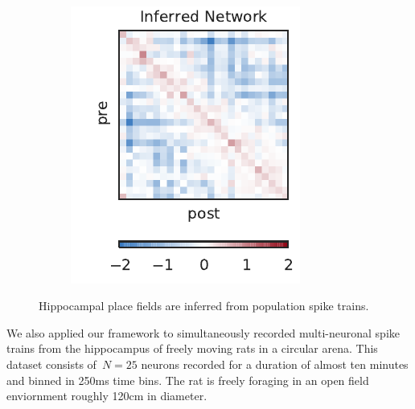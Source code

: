\begin{figure}[t!]
\begin{subfigure}[b]{2.25in}
    \label{fig:hipp_pll}
  \end{subfigure}
  ~
  \begin{subfigure}[b]{1.85in}
    \centering
    \caption{}
    \vspace{-.2in}
    \includegraphics[width=\textwidth]{figures/ch3/hipp_connectivity.pdf}
    \label{fig:hipp_conn}
  \end{subfigure}
  \vspace{-2em}
  \caption{Hippocampal place fields are inferred from population spike trains.
    }
  \label{fig:hipp}
\end{figure}

We also applied our framework to simultaneously recorded multi-neuronal spike trains from the hippocampus of freely moving rats in a circular arena. 
This dataset consists of~$N=25$ neurons recorded for a duration of almost ten minutes and binned in 250ms time bins.
The rat is freely foraging in an open field enviornment roughly 120cm in diameter.

